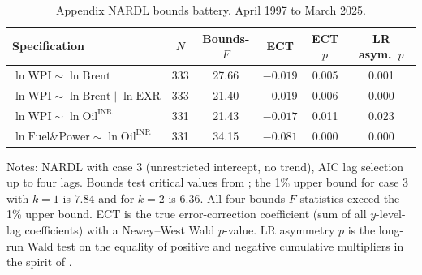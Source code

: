 \begin{table}[h]
\centering
\caption{Appendix NARDL bounds battery. April 1997 to March 2025.}
\label{tab:nardl}
\footnotesize
\setlength{\tabcolsep}{5pt}
\begin{threeparttable}
\begin{tabular}{l c c c c c}
\toprule
Specification & $N$ & Bounds-$F$ & ECT & ECT $p$ & LR asym.\ $p$ \\
\midrule
$\ln \mathrm{WPI} \sim \ln \mathrm{Brent}$ & 333 & 27.66 & $-0.019$ & 0.005 & 0.001 \\
$\ln \mathrm{WPI} \sim \ln \mathrm{Brent} \mid \ln \mathrm{EXR}$ & 333 & 21.40 & $-0.019$ & 0.006 & 0.000 \\
$\ln \mathrm{WPI} \sim \ln \mathrm{Oil^{INR}}$ & 331 & 21.43 & $-0.017$ & 0.011 & 0.023 \\
$\ln \mathrm{Fuel\&Power} \sim \ln \mathrm{Oil^{INR}}$ & 331 & 34.15 & $-0.081$ & 0.000 & 0.000 \\
\bottomrule
\end{tabular}
\begin{tablenotes}\footnotesize
\item Notes: NARDL with case 3 (unrestricted intercept, no trend), AIC lag selection up to four lags. Bounds test critical values from \citet{pesaran2001}; the 1\% upper bound for case 3 with $k=1$ is $7.84$ and for $k=2$ is $6.36$. All four bounds-$F$ statistics exceed the 1\% upper bound. ECT is the true error-correction coefficient (sum of all $y$-level-lag coefficients) with a Newey--West Wald $p$-value. LR asymmetry $p$ is the long-run Wald test on the equality of positive and negative cumulative multipliers in the spirit of \citet{shin2014}.
\end{tablenotes}
\end{threeparttable}
\end{table}
